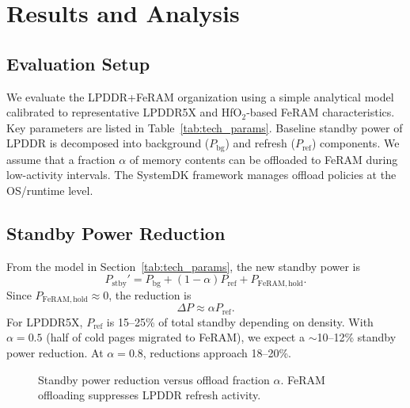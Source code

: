 \section{Results and Analysis}

\subsection{Evaluation Setup}
We evaluate the LPDDR+FeRAM organization using a simple analytical model calibrated to representative LPDDR5X and HfO$_2$-based FeRAM characteristics.
Key parameters are listed in Table~\ref{tab:tech_params}. 
Baseline standby power of LPDDR is decomposed into background ($P_{\mathrm{bg}}$) and refresh ($P_{\mathrm{ref}}$) components.
We assume that a fraction $\alpha$ of memory contents can be offloaded to FeRAM during low-activity intervals. 
The SystemDK framework manages offload policies at the OS/runtime level.

\subsection{Standby Power Reduction}
From the model in Section~\ref{tab:tech_params}, the new standby power is
\[
P_{\mathrm{stby}}' = P_{\mathrm{bg}} + (1-\alpha) P_{\mathrm{ref}} + P_{\mathrm{FeRAM,hold}}.
\]
Since $P_{\mathrm{FeRAM,hold}}\!\approx\!0$, the reduction is
\[
\Delta P \approx \alpha P_{\mathrm{ref}}.
\]
For LPDDR5X, $P_{\mathrm{ref}}$ is 15--25\% of total standby depending on density. 
With $\alpha = 0.5$ (half of cold pages migrated to FeRAM), we expect a $\sim$10--12\% standby power reduction. 
At $\alpha = 0.8$, reductions approach 18--20\%.

\begin{figure}[t]
  \centering
  \caption{Standby power reduction versus offload fraction $\alpha$. FeRAM offloading suppresses LPDDR refresh activity.}
  \label{fig:standby_reduction}
\end{figure}

